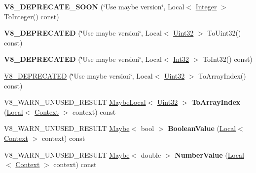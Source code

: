 \begin{DoxyCompactItemize}
\item 
{\bfseries V8\+\_\+\+D\+E\+P\+R\+E\+C\+A\+T\+E\+\_\+\+S\+O\+ON} (\char`\"{}Use maybe version\char`\"{}, Local$<$ \hyperlink{classv8_1_1_integer}{Integer} $>$ To\+Integer() const)\hypertarget{classv8_1_1_value_aaf6d45da85632495545435e44ed2eeab}{}\label{classv8_1_1_value_aaf6d45da85632495545435e44ed2eeab}

\item 
{\bfseries V8\+\_\+\+D\+E\+P\+R\+E\+C\+A\+T\+ED} (\char`\"{}Use maybe version\char`\"{}, Local$<$ \hyperlink{classv8_1_1_uint32}{Uint32} $>$ To\+Uint32() const)\hypertarget{classv8_1_1_value_a266f96f746d6addf7b829a1f0c62b2af}{}\label{classv8_1_1_value_a266f96f746d6addf7b829a1f0c62b2af}

\item 
{\bfseries V8\+\_\+\+D\+E\+P\+R\+E\+C\+A\+T\+ED} (\char`\"{}Use maybe version\char`\"{}, Local$<$ \hyperlink{classv8_1_1_int32}{Int32} $>$ To\+Int32() const)\hypertarget{classv8_1_1_value_a0431dfa7c7236d58949f649802f4a03a}{}\label{classv8_1_1_value_a0431dfa7c7236d58949f649802f4a03a}

\item 
\hyperlink{classv8_1_1_value_adedc431c9a5f9fc875027c773cc26585}{V8\+\_\+\+D\+E\+P\+R\+E\+C\+A\+T\+ED} (\char`\"{}Use maybe version\char`\"{}, Local$<$ \hyperlink{classv8_1_1_uint32}{Uint32} $>$ To\+Array\+Index() const)
\item 
V8\+\_\+\+W\+A\+R\+N\+\_\+\+U\+N\+U\+S\+E\+D\+\_\+\+R\+E\+S\+U\+LT \hyperlink{classv8_1_1_maybe_local}{Maybe\+Local}$<$ \hyperlink{classv8_1_1_uint32}{Uint32} $>$ {\bfseries To\+Array\+Index} (\hyperlink{classv8_1_1_local}{Local}$<$ \hyperlink{classv8_1_1_context}{Context} $>$ context) const \hypertarget{classv8_1_1_value_abac68de66288d00b3b612c20e5059515}{}\label{classv8_1_1_value_abac68de66288d00b3b612c20e5059515}

\item 
V8\+\_\+\+W\+A\+R\+N\+\_\+\+U\+N\+U\+S\+E\+D\+\_\+\+R\+E\+S\+U\+LT \hyperlink{classv8_1_1_maybe}{Maybe}$<$ bool $>$ {\bfseries Boolean\+Value} (\hyperlink{classv8_1_1_local}{Local}$<$ \hyperlink{classv8_1_1_context}{Context} $>$ context) const \hypertarget{classv8_1_1_value_ae6e855a09c4b60ec2c4674731d0d365c}{}\label{classv8_1_1_value_ae6e855a09c4b60ec2c4674731d0d365c}

\item 
V8\+\_\+\+W\+A\+R\+N\+\_\+\+U\+N\+U\+S\+E\+D\+\_\+\+R\+E\+S\+U\+LT \hyperlink{classv8_1_1_maybe}{Maybe}$<$ double $>$ {\bfseries Number\+Value} (\hyperlink{classv8_1_1_local}{Local}$<$ \hyperlink{classv8_1_1_context}{Context} $>$ context) const \hypertarget{classv8_1_1_value_a3dcd02e3d5ee791e0c42c7f2ebfedbaf}{}\label{classv8_1_1_value_a3dcd02e3d5ee791e0c42c7f2ebfedbaf}


\end{DoxyCompactItemize}
